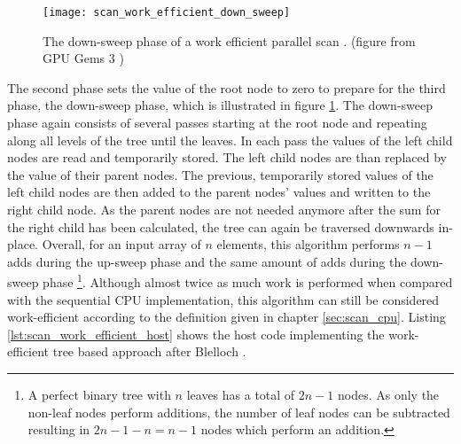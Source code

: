 \begin{figure}
\centering
\texttt{[image: scan\_work\_efficient\_down\_sweep]}
\caption{The down-sweep phase of a work efficient parallel scan \cite{scan_blelloch}.  (figure from GPU Gems 3 \cite{gpu_gems_3_chapter_39})}
\label{fig:scan_work_efficient_down_sweep}
\end{figure}

The second phase sets the value of the root node to zero to prepare for the third phase, the down-sweep phase, which is illustrated in figure \ref{fig:scan_work_efficient_down_sweep}. The down-sweep phase again consists of several passes starting at the root node and repeating along all levels of the tree until the leaves. In each pass the values of the left child nodes are read and temporarily stored. The left child nodes are than replaced by the value of their parent nodes. The previous, temporarily stored values of the left child nodes are then added to the parent nodes' values and written to the right child node. As the parent nodes are not needed anymore after the sum for the right child has been calculated, the tree can again be traversed downwards in-place.
Overall, for an input array of $n$ elements, this algorithm performs $n - 1$ adds during the up-sweep phase and the same amount of adds during the down-sweep phase \footnote{A perfect binary tree with $n$ leaves has a total of $2n - 1$ nodes. As only the non-leaf nodes perform additions, the number of leaf nodes can be subtracted resulting in $2n - 1 - n = n - 1$ nodes which perform an addition.}. Although almost twice as much work is performed when compared with the sequential CPU implementation, this algorithm can still be considered work-efficient according to the definition given in chapter \ref{sec:scan_cpu}.
Listing \ref{lst:scan_work_efficient_host} shows the host code implementing the work-efficient tree based approach after Blelloch \cite{scan_blelloch}.



